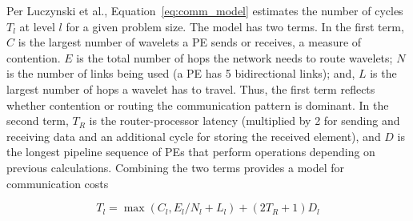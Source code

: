 \documentclass[sigconf]{acmart}
\begin{document}
    Per Luczynski et al., Equation~\eqref{eq:comm_model} estimates the number of cycles $T_l$ at level $l$ for a given problem size.   The model has two terms.   In the first term, $C$ is the largest number of wavelets a PE sends or receives, a measure of contention.  $E$ is the total number of hops the network needs to route wavelets; $N$ is the number of links being used (a PE has 5 bidirectional links); and, $L$ is the largest number of hops a wavelet has to travel.  Thus, the first term reflects whether contention or routing the communication pattern is dominant.
    In the second term, $T_R$ is the router-processor latency (multiplied by 2 for sending and receiving data and an additional cycle for storing the received element), and $D$ is the longest pipeline sequence of PEs that perform operations depending on previous calculations.  Combining the two terms provides a model for communication costs %

    \begin{equation}
        T_l = \max \left( C_l, E_l / N_l + L_l \right) + (2 T_R + 1) D_l
        \label{eq:comm_model}
    \end{equation}
\end{document}
